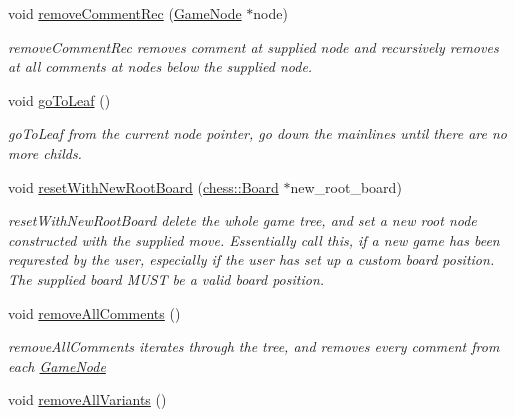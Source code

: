 \begin{DoxyCompactItemize}
void \hyperlink{classchess_1_1Game_acb9da8af7684660ec3880f15143e051b}{remove\-Comment\-Rec} (\hyperlink{classchess_1_1GameNode}{Game\-Node} $\ast$node)
\begin{DoxyCompactList}\small\item\em remove\-Comment\-Rec removes comment at supplied node and recursively removes at all comments at nodes below the supplied node. \end{DoxyCompactList}\item 
\hypertarget{classchess_1_1Game_a37f62be6e55d2e3415f5e08016e9c038}{void \hyperlink{classchess_1_1Game_a37f62be6e55d2e3415f5e08016e9c038}{go\-To\-Leaf} ()}\label{classchess_1_1Game_a37f62be6e55d2e3415f5e08016e9c038}

\begin{DoxyCompactList}\small\item\em go\-To\-Leaf from the current node pointer, go down the mainlines until there are no more childs. \end{DoxyCompactList}\item 
void \hyperlink{classchess_1_1Game_ae7d450a354b5943cca2a60380f5152b4}{reset\-With\-New\-Root\-Board} (\hyperlink{classchess_1_1Board}{chess\-::\-Board} $\ast$new\-\_\-root\-\_\-board)
\begin{DoxyCompactList}\small\item\em reset\-With\-New\-Root\-Board delete the whole game tree, and set a new root node constructed with the supplied move. Essentially call this, if a new game has been requrested by the user, especially if the user has set up a custom board position. The supplied board M\-U\-S\-T be a valid board position. \end{DoxyCompactList}\item 
\hypertarget{classchess_1_1Game_a18ab6e0fd6ee734a9810886f57e87b5a}{void \hyperlink{classchess_1_1Game_a18ab6e0fd6ee734a9810886f57e87b5a}{remove\-All\-Comments} ()}\label{classchess_1_1Game_a18ab6e0fd6ee734a9810886f57e87b5a}

\begin{DoxyCompactList}\small\item\em remove\-All\-Comments iterates through the tree, and removes every comment from each \hyperlink{classchess_1_1GameNode}{Game\-Node} \end{DoxyCompactList}\item 
\hypertarget{classchess_1_1Game_a0bad886ab7d0041ae777afa84667dca3}{void \hyperlink{classchess_1_1Game_a0bad886ab7d0041ae777afa84667dca3}{remove\-All\-Variants} ()}\label{classchess_1_1Game_a0bad886ab7d0041ae777afa84667dca3}


\end{DoxyCompactItemize}

